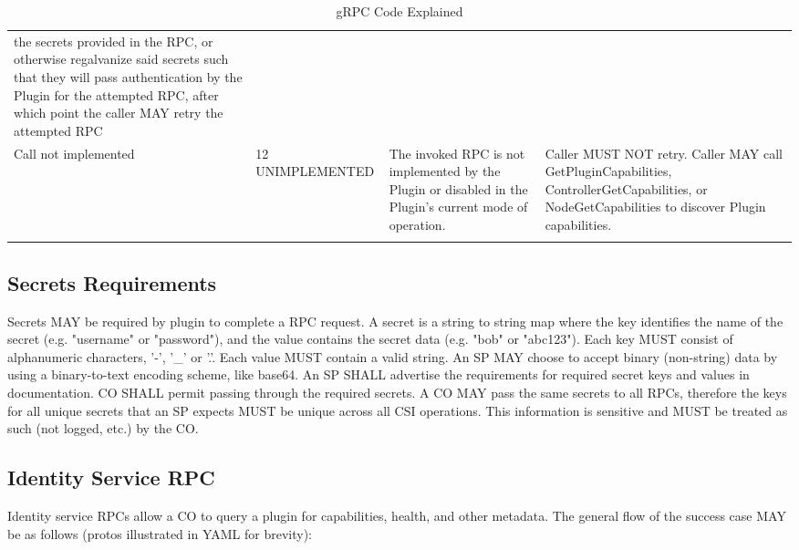 \documentclass[12pt]{article}
\begin{document}
{\begin{center}
\begin{landscape}
\begin{table}[H]
\begin{threeparttable}
\begin{tabular}{p{7em}p{12em}p{20em}p{20em}}
      the secrets provided in the RPC, or otherwise regalvanize said
      secrets such that they will pass authentication by the Plugin for
      the attempted RPC, after which point the caller MAY retry the
      attempted RPC \\
  Call not implemented & 12 UNIMPLEMENTED & The invoked RPC is not
      implemented by the Plugin or disabled in the Plugin's current mode
      of operation. & Caller MUST NOT retry. Caller MAY call
      GetPluginCapabilities, ControllerGetCapabilities, or
      NodeGetCapabilities to discover Plugin capabilities. \\
    \bottomrule\addlinespace[1ex]
  \end{tabular}
  \end{threeparttable}
    \caption{gRPC Code Explained}
    \label{tab:grpc-code-explained}
  \end{table}
  \end{landscape}
  \end{center}
}


\subsection{Secrets Requirements}

Secrets MAY be required by plugin to complete a RPC request. A secret is
a string to string map where the key identifies the name of the secret
(e.g. "username" or "password"), and the value contains the secret data
(e.g. "bob" or "abc123"). Each key MUST consist of alphanumeric
characters, '-', '\_' or '.'. Each value MUST contain a valid string. An
SP MAY choose to accept binary (non-string) data by using a
binary-to-text encoding scheme, like base64. An SP SHALL advertise the
requirements for required secret keys and values in documentation. CO
SHALL permit passing through the required secrets. A CO MAY pass the
same secrets to all RPCs, therefore the keys for all unique secrets that
an SP expects MUST be unique across all CSI operations. This information
is sensitive and MUST be treated as such (not logged, etc.) by the CO.

\subsection{Identity Service RPC}
Identity service RPCs allow a CO to query a plugin for capabilities,
health, and other metadata. The general flow of the success case MAY be
as follows (protos illustrated in YAML for brevity):
\end{document}

